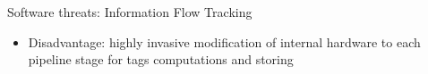 \begin{frame}{Software threats: Information Flow Tracking}
\begin{minipage}[c]{0.55\textwidth}
{            \begin{alertblock}{}
                \begin{itemize}
                    [square]
                    \justifying
                    \item Disadvantage: highly invasive modification of internal hardware to each pipeline stage for tags computations and storing
                \end{itemize}
            \end{alertblock}
        }
    \end{minipage}\hfill%
    \begin{minipage}[c]{0.4\textwidth}
\end{minipage}
\end{frame}
